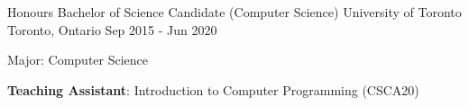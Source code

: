 
\begin{cventries}
  \cventry
    {Honours Bachelor of Science Candidate (Computer Science)}
    {University of Toronto}
    {Toronto, Ontario}
    {Sep 2015 - Jun 2020}
    {
      \begin{cvitems}
        \item {Major: Computer Science}
        \item {\textbf{Teaching Assistant}: Introduction to Computer Programming (CSCA20)}
      \end{cvitems}
    }
\end{cventries}
